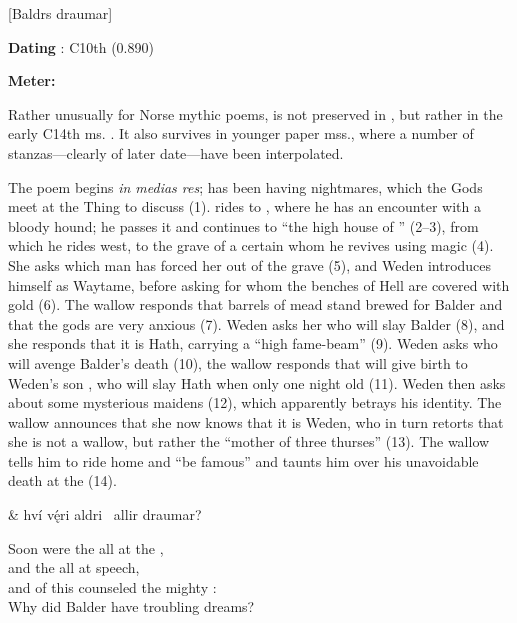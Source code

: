 [Baldrs draumar]

\begin{flushright}%
\textbf{Dating} \parencite{Sapp2022}: C10th (0.890)

\textbf{Meter:} \Fornyrdislag%
\end{flushright}

Rather unusually for Norse mythic poems, \Baldrsdraumar is not preserved in \Regius, but rather in the early C14th ms. \AM.  It also survives in younger paper mss., where a number of stanzas—clearly of later date—have been interpolated.

The poem begins \emph{in medias res};  has been having nightmares, which the Gods meet at the Thing to discuss (1).   rides to , where he has an encounter with a bloody hound; he passes it and continues to “the high house of ” (2–3), from which he rides west, to the grave of a certain  whom he revives using magic (4). She asks which man has forced her out of the grave (5), and Weden introduces himself as Waytame, before asking for whom the benches of Hell are covered with gold (6). The wallow responds that barrels of mead stand brewed for Balder and that the gods are very anxious (7). Weden asks her who will slay Balder (8), and she responds that it is Hath, carrying a “high fame-beam” (9).  Weden asks who will avenge Balder’s death (10), the wallow responds that  will give birth to Weden’s son , who will slay Hath when only one night old (11).  Weden then asks about some mysterious maidens (12), which apparently betrays his identity.  The wallow announces that she now knows that it is Weden, who in turn retorts that she is not a wallow, but rather the “mother of three thurses” (13). The wallow tells him to ride home and “be famous” and taunts him over his unavoidable death at the  (14).

\sectionline

\bvg\bva{}%
 &
hví vę́ri aldri \hld\ allir draumar?\eva

\bvb Soon were the  all at the , \\
and the  all at speech, \\
and of this counseled the mighty : \\
Why did Balder have troubling dreams?\evb\evg


